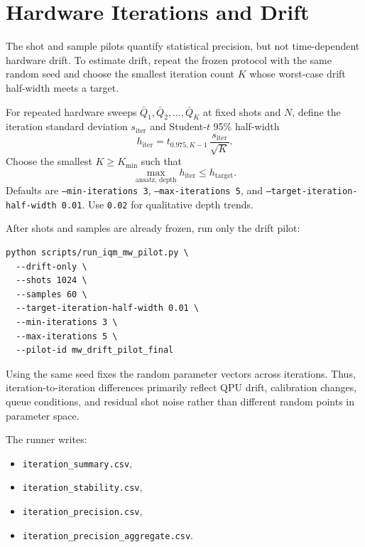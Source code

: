 \documentclass[11pt]{article}
\begin{document}
\section{Hardware Iterations and Drift}

The shot and sample pilots quantify statistical precision, but not
time-dependent hardware drift. To estimate drift, repeat the frozen protocol with
the same random seed and choose the smallest iteration count \(K\) whose
worst-case drift half-width meets a target.

For repeated hardware sweeps \(\bar Q_1,\bar Q_2,\dots,\bar Q_K\) at fixed shots
and \(N\), define the iteration standard deviation \(s_{\mathrm{iter}}\) and
Student-\(t\) 95\% half-width
\begin{equation}
h_{\mathrm{iter}}
=
t_{0.975,K-1}\,
\frac{s_{\mathrm{iter}}}{\sqrt{K}}.
\end{equation}
Choose the smallest \(K \ge K_{\min}\) such that
\begin{equation}
\max_{\text{ansatz, depth}} h_{\mathrm{iter}} \le h_{\mathrm{target}}.
\end{equation}
Defaults are \texttt{--min-iterations 3}, \texttt{--max-iterations 5}, and
\texttt{--target-iteration-half-width 0.01}. Use \texttt{0.02} for qualitative
depth trends.

After shots and samples are already frozen, run only the drift pilot:
\begin{verbatim}
python scripts/run_iqm_mw_pilot.py \
  --drift-only \
  --shots 1024 \
  --samples 60 \
  --target-iteration-half-width 0.01 \
  --min-iterations 3 \
  --max-iterations 5 \
  --pilot-id mw_drift_pilot_final
\end{verbatim}

Using the same seed fixes the random parameter vectors across iterations. Thus,
iteration-to-iteration differences primarily reflect QPU drift, calibration
changes, queue conditions, and residual shot noise rather than different random
points in parameter space.

The runner writes:
\begin{itemize}
  \item \texttt{iteration\_summary.csv},
  \item \texttt{iteration\_stability.csv},
  \item \texttt{iteration\_precision.csv},
  \item \texttt{iteration\_precision\_aggregate.csv}.
\end{itemize}
\end{document}
